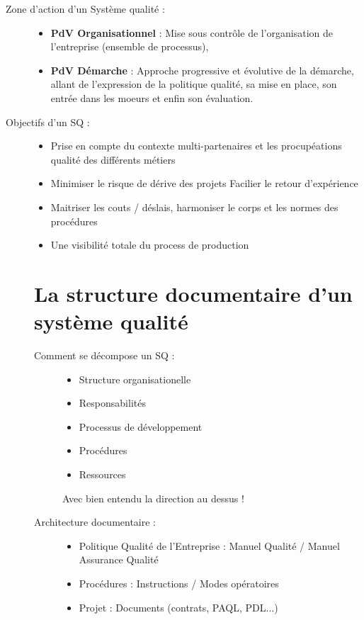 \begin{description}
\item[Zone d’action d’un Système qualité :]
\begin{itemize}
\item \textbf{PdV Organisationnel} : Mise sous contrôle de l’organisation de l’entreprise (ensemble de processus),
\item \textbf{PdV Démarche} : Approche progressive et évolutive de la démarche, allant de l’expression de la politique qualité, sa mise en place, son entrée dans les moeurs et enfin son évaluation.
\end{itemize}

\item[Objectifs d’un SQ :]
\begin{itemize}
\item Prise en compte du contexte multi-partenaires et les procupéations qualité des différents métiers
\item Minimiser le risque de dérive des projets
Facilier le retour d’expérience
\item Maitriser les couts / déslais, harmoniser le corps et les normes des procédures
\item Une visibilité totale du process de production
\end{itemize}

\section{La structure documentaire d’un système qualité}


\begin{description}
\item[Comment se décompose un SQ :]
\begin{itemize}
\item Structure organisationelle
\item Responsabilités
\item Processus de développement
\item Procédures 
\item Ressources
\end{itemize}
Avec bien entendu la direction au dessus ! \\

\item[Architecture documentaire :]
\begin{itemize}
\item Politique Qualité de l’Entreprise : Manuel Qualité / Manuel Assurance Qualité
\item Procédures : Instructions / Modes opératoires 
\item Projet : Documents (contrats, PAQL, PDL...)
\end{itemize}
\end{description}


\end{description}
